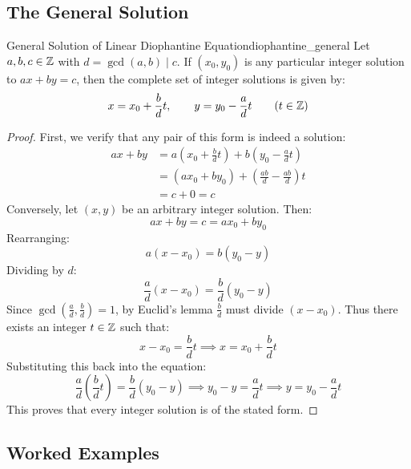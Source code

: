\documentclass[a4paper]{article}
\begin{document}
\subsection{The General Solution}
\begin{mytheorem}{General Solution of Linear Diophantine Equation}{diophantine_general}
  Let $a, b, c \in \mathbb{Z}$ with $d = \gcd(a, b) \mid c$.
  If $(x_0, y_0)$ is any particular integer solution to $a x + b y = c$, then the complete set of integer solutions is given by:
  \[
    x = x_0 + \frac{b}{d} t, \qquad y = y_0 - \frac{a}{d} t \qquad (t \in \mathbb{Z})
  \]

  \begin{proof}
    First, we verify that any pair of this form is indeed a solution:
    \begin{align*}
      a x + b y & = a\left( x_0 + \frac{b}{d} t \right) + b\left( y_0 - \frac{a}{d} t \right) \\
      & = (a x_0 + b y_0) + \left( \frac{a b}{d} - \frac{a b}{d} \right) t \\
      & = c + 0 = c
    \end{align*}
    Conversely, let $(x, y)$ be an arbitrary integer solution.
    Then:
    \[
      a x + b y = c = a x_0 + b y_0
    \]
    Rearranging:
    \[
      a(x - x_0) = b(y_0 - y)
    \]
    Dividing by $d$:
    \[
      \frac{a}{d} (x - x_0) = \frac{b}{d} (y_0 - y)
    \]
    Since $\gcd\left(\frac{a}{d}, \frac{b}{d}\right) = 1$, by Euclid's lemma $\frac{b}{d}$ must divide $(x - x_0)$.
    Thus there exists an integer $t \in \mathbb{Z}$ such that:
    \[
      x - x_0 = \frac{b}{d} t \implies x = x_0 + \frac{b}{d} t
    \]
    Substituting this back into the equation:
    \[
      \frac{a}{d} \left(\frac{b}{d} t\right) = \frac{b}{d} (y_0 - y) \implies y_0 - y = \frac{a}{d} t \implies y = y_0 - \frac{a}{d} t
    \]
    This proves that every integer solution is of the stated form.
  \end{proof}
\end{mytheorem}

\subsection{Worked Examples}
\end{document}
